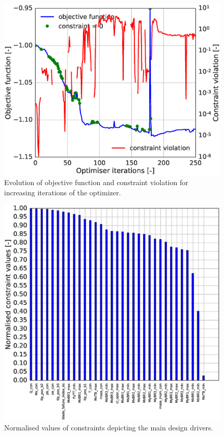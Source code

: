\begin{figure}[pht]
\begin{center}
	\includegraphics[width=.85\linewidth]{figures/KB6_final/KB5_obj_cons_ipopt.eps}
\end{center}
\caption{Evolution of objective function and constraint violation for increasing iterations of the optimizer.}
\label{fig:KB5_objf}
\end{figure}

\begin{figure}[pht]
\begin{center}
	\includegraphics[width=.85\linewidth]{figures/KB6_final/KB5_cons_list.eps}
\end{center}
\caption{Normalised values of constraints depicting the main design drivers.}
\label{fig:KB5_cons}
\end{figure}



